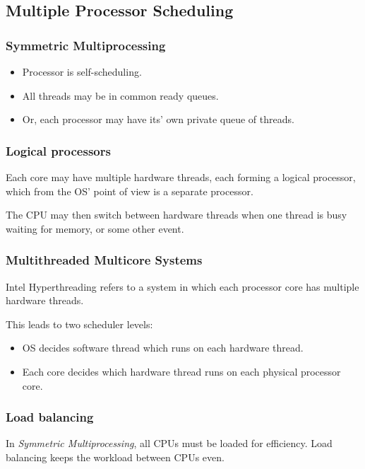 \subsection{Multiple Processor Scheduling}


\subsubsection{Symmetric Multiprocessing}

\begin{itemize}
    \item Processor is self-scheduling.
    \item All threads may be in common ready queues.
    \item Or, each processor may have its' own private queue of threads.
\end{itemize}


\subsubsection{Logical processors}

Each core may have multiple hardware threads, each forming a logical
processor, which from the OS' point of view is a separate processor.

The CPU may then switch between hardware threads when one thread is busy
waiting for memory, or some other event.


\subsubsection{Multithreaded Multicore Systems}

Intel Hyperthreading refers to a system in which each processor core has
multiple hardware threads.

This leads to two scheduler levels:
\begin{itemize}
    \item OS decides software thread which runs on each hardware thread.
    \item Each core decides which hardware thread runs on each physical processor core.
\end{itemize}


\subsubsection{Load balancing}

In \textit{Symmetric Multiprocessing}, all CPUs must be loaded for efficiency. Load
balancing keeps the workload between CPUs even.

